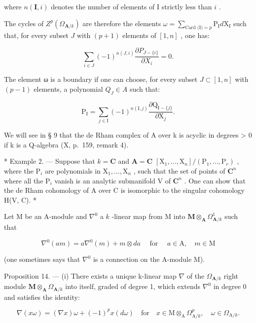 where \(n(\mathbf{I}, i)\) denotes the number of elements of I strictly less than \(i\) .

The cycles of \(Z^{p}(\Omega_{\mathbf{A}/k})\) are therefore the elements \(\omega = \sum_{\text{Card (I)} = p} \mathrm{P}_{\mathrm{I}} d\mathrm{X}_{\mathrm{I}}\) such that, for every subset \(J\) with \((p + 1)\) elements of \([1, n]\) , one has:

\[
\sum_ {i \in J} (- 1) ^ {n (J, i)} \frac {\partial P _ {J - \{i \}}}{\partial X _ {i}} = 0.
\]

The element ω is a boundary if one can choose, for every subset \(J \subset [1, n]\) with \((p - 1)\) elements, a polynomial \(Q_{J} \in A\) such that:

\[
\mathrm{P} _ {\mathrm{I}} = \sum_ {j \in \mathrm{I}} (- 1) ^ {n (\mathrm{I}, j)} \frac {\partial \mathrm{Q} _ {\mathrm{I} - \{j \}}}{\partial \mathrm{X} _ {j}}.
\]

We will see in § 9 that the de Rham complex of A over k is acyclic in degrees \textgreater{} 0 if k is a Q-algebra (X, p.~159, remark 4).

* Example 2. --- Suppose that \(k = \mathbf{C}\) and \(\mathbf{A} = \mathbf{C}\) \([\mathrm{X}_1, \ldots, \mathrm{X}_n] / (\mathrm{P}_1, \ldots, \mathrm{P}_r)\) , where the \(\mathrm{P}_i\) are polynomials in \(\mathrm{X}_1, \ldots, \mathrm{X}_n\) , such that the set of points of \(\mathbf{C}^n\) where all the \(\mathrm{P}_i\) vanish is an analytic submanifold V of \(\mathbf{C}^n\) . One can show that the de Rham cohomology of A over C is isomorphic to the singular cohomology H(V, C). *

Let M be an A-module and \(\nabla^{0}\) a \(k\) -linear map from M into \(\mathbf{M} \otimes_{\mathbf{A}} \Omega_{\mathbf{A}/k}^{1}\) such that

\[
\nabla^ {0} (a m) = a \nabla^ {0} (m) + m \otimes d a \quad \text { for } \quad a \in \mathrm{A}, \quad m \in \mathrm{M}\tag{13}
\]

(one sometimes says that \(\nabla^{0}\) is a connection on the A-module M).

Proposition 14. --- (i) There exists a unique k-linear map \(\nabla\) of the \(\Omega_{\mathbf{A}/k}\) right module \(\mathbf{M} \otimes_{\mathbf{A}} \Omega_{\mathbf{A}/k}\) into itself, graded of degree 1, which extends \(\nabla^{0}\) in degree 0 and satisfies the identity:

\[
\nabla (x \omega) = (\nabla x) \omega + (- 1) ^ {p} x (d \omega) \quad \mathrm{for} \quad x \in \mathrm{M} \otimes_ {\mathrm{A}} \Omega_ {\mathrm{A} / k} ^ {p}, \quad \omega \in \Omega_ {\mathrm{A} / k}. \tag {14}
\]

